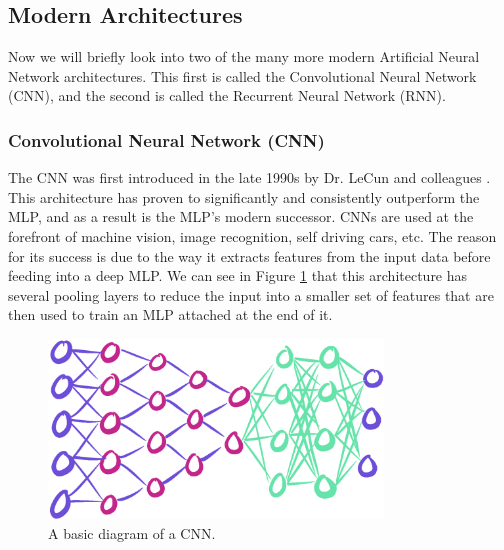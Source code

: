 \documentclass[12pt]{report}
\begin{document}
\subsection{Modern Architectures}
Now we will briefly look into two of the many more modern Artificial Neural Network architectures.
This first is called the Convolutional Neural Network (CNN), and the second is called the Recurrent Neural Network (RNN).
\subsubsection{Convolutional Neural Network (CNN)}
The CNN was first introduced in the late 1990s by Dr. LeCun and colleagues \cite{lecun1998gradient}.
This architecture has proven to significantly and consistently outperform the MLP, and as a result is the MLP's modern successor.
CNNs are used at the forefront of machine vision, image recognition, self driving cars, etc.
The reason for its success is due to the way it extracts features from the input data before feeding into a deep MLP.
We can see in Figure \ref{cnn} that this architecture has several pooling layers to reduce the input into a smaller set of features that are then used to train an MLP attached at the end of it.
\begin{figure}[hbt!]
    \centering
    \includegraphics[width=3.5in]{figures/cnn.PNG}
    \caption{A basic diagram of a CNN.}
    \label{cnn}
\end{figure}
\end{document}
